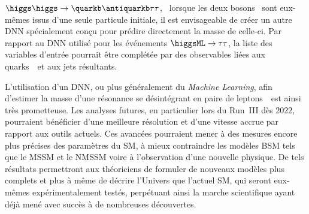 $\higgs\higgs\to\quarkb\antiquarkb\tau\tau$,
\ie\ lorsque les deux bosons \higgs\ sont eux-mêmes issus d'une seule particule initiale,
il est envisageable de créer un autre DNN
spécialement conçu pour prédire directement la masse de celle-ci.
Par rapport au DNN utilisé pour les événements $\higgsML\to\tau\tau$,
la liste des variables d'entrée pourrait être complétée
par des observables liées aux quarks~\quarkb\ et aux jets résultants.
\par
L'utilisation d'un DNN, ou plus généralement du \emph{Machine Learning}, afin d'estimer la masse d'une résonance se désintégrant en paire de leptons~\tau\
est ainsi très prometteuse.
Les analyses futures, en particulier lors du Run~III dès 2022,
pourraient bénéficier d'une meilleure résolution et d'une vitesse accrue par rapport aux outils actuels.
Ces avancées pourraient mener
à des mesures encore plus précises des paramètres du SM,
à mieux contraindre les modèles BSM tels que le MSSM et le NMSSM
voire
à l'observation d'une nouvelle physique.
De tels résultats permettront aux théoriciens de formuler de nouveaux modèles
plus complets
et plus à même de décrire l'Univers
que l'actuel SM,
qui seront eux-mêmes expérimentalement testés,
perpétuant ainsi la marche scientifique
ayant déjà mené avec succès à de nombreuses découvertes.